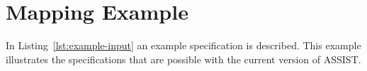 
\chapter{Mapping Example }
\label{cha:example-input}

In Listing~\ref{lst:example-input} an example specification is described. This example illustrates the specifications that are possible with the current version of ASSIST.

  


